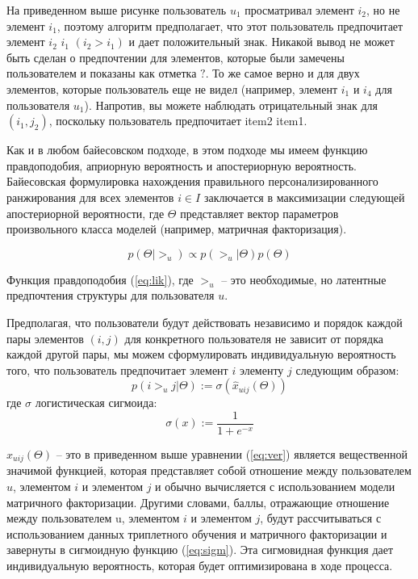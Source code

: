     На приведенном выше рисунке пользователь ${u_1}$
    просматривал элемент ${i_2}$, но не элемент ${i_1}$,
    поэтому алгоритм предполагает, что этот пользователь 
    предпочитает элемент ${i_2}$ ${i_1}$ ${(i_2 > i_1)}$ и дает положительный 
    знак. Никакой вывод не может быть сделан о предпочтении для элементов, 
    которые были замечены пользователем и показаны как отметка $?$. То же 
    самое верно и для двух элементов, которые пользователь еще не видел 
    (например, элемент ${i_1}$ и ${i_4}$ для пользователя ${u_1}$).
     Напротив, вы можете наблюдать отрицательный знак для ${(i_1, j_2)}$,
      поскольку пользователь предпочитает item2 item1.

      Как и в любом байесовском подходе, в этом подходе мы имеем функцию правдоподобия, априорную вероятность и апостериорную вероятность.
      Байесовская формулировка нахождения правильного персонализированного 
      ранжирования для всех элементов ${i \in I}$ заключается в максимизации 
      следующей апостериорной вероятности, где $\Theta$ представляет вектор 
      параметров произвольного класса моделей (например, матричная 
      факторизация).

      \begin{equation}
        p(\Theta| >_u) \propto p(>_u| \Theta)p(\Theta)
        \label{eq:lik}
      \end{equation}

      Функция правдоподобия (\ref{eq:lik}), где ${>_u}$ -- это необходимые, 
      но латентные предпочтения структуры для пользователя $u$.

      Предполагая, что пользователи будут действовать независимо и порядок 
      каждой пары элементов ${(i, j)}$ для конкретного пользователя не зависит 
      от порядка каждой другой пары, мы можем сформулировать индивидуальную 
      вероятность того, что пользователь предпочитает элемент $i$ элементу $j$ 
      следующим образом:
      \begin{equation}
        p(i >_u j|\Theta) := \sigma(\hat x_{uij}(\Theta))
        \label{eq:ver}
      \end{equation}
    где $\sigma$ логистическая сигмоида: 
    \begin{equation}
        \sigma(x) := \frac{1}{1+e^{-x}}
        \label{eq:sigm}
      \end{equation}

${\hat x_{uij}(\Theta)}$ -- это в приведенном выше уравнении (\ref{eq:ver}) является 
вещественной значимой функцией, которая представляет собой отношение 
между пользователем $u$, элементом $i$ и элементом $j$ и обычно вычисляется 
с использованием модели матричного факторизации. Другими словами, баллы, 
отражающие отношение между пользователем u, элементом $i$ и элементом $j$, 
будут рассчитываться с использованием данных триплетного обучения и 
матричного факторизации и завернуты в сигмоидную функцию (\ref{eq:sigm}). Эта сигмовидная 
функция дает индивидуальную вероятность, которая будет оптимизирована в 
ходе процесса.

